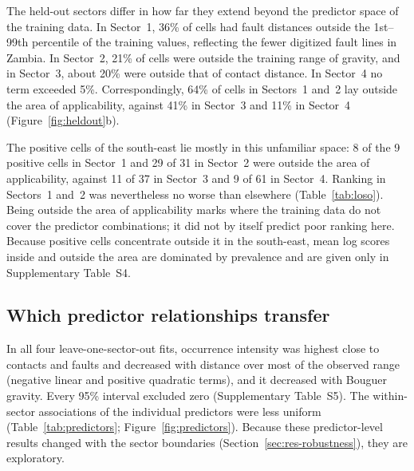 \documentclass[pdflatex,sn-basic]{sn-jnl}%
\begin{document}
The held-out sectors differ in how far they extend beyond the predictor space of the training data. In Sector~1, 36\% of cells had fault distances outside the 1st--99th percentile of the training values, reflecting the fewer digitized fault lines in Zambia. In Sector~2, 21\% of cells were outside the training range of gravity, and in Sector~3, about 20\% were outside that of contact distance. In Sector~4 no term exceeded 5\%. Correspondingly, 64\% of cells in Sectors~1 and~2 lay outside the area of applicability, against 41\% in Sector~3 and 11\% in Sector~4 (Figure~\ref{fig:heldout}b).

The positive cells of the south-east lie mostly in this unfamiliar space: 8 of the 9 positive cells in Sector~1 and 29 of 31 in Sector~2 were outside the area of applicability, against 11 of 37 in Sector~3 and 9 of 61 in Sector~4. Ranking in Sectors~1 and~2 was nevertheless no worse than elsewhere (Table~\ref{tab:loso}). Being outside the area of applicability marks where the training data do not cover the predictor combinations; it did not by itself predict poor ranking here. Because positive cells concentrate outside it in the south-east, mean log scores inside and outside the area are dominated by prevalence and are given only in Supplementary Table~S4.

\subsection{Which predictor relationships transfer}
\label{sec:res-predictors}

In all four leave-one-sector-out fits, occurrence intensity was highest close to contacts and faults and decreased with distance over most of the observed range (negative linear and positive quadratic terms), and it decreased with Bouguer gravity. Every 95\% interval excluded zero (Supplementary Table~S5). The within-sector associations of the individual predictors were less uniform (Table~\ref{tab:predictors}; Figure~\ref{fig:predictors}). Because these predictor-level results changed with the sector boundaries (Section~\ref{sec:res-robustness}), they are exploratory.
\end{document}
